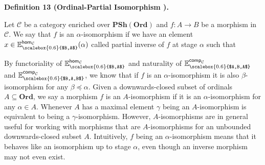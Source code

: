 \documentclass[10pt,a4paper]{article}
\begin{document}
 
 
\par\medskip\noindent\textbf{Definition 13 (Ordinal-Partial Isomorphism ).}\par
 
 
Let $\mathcal{C}$ be a category enriched over $\mathbf{PSh}(\mathbf{Ord})$ and $f:A\to B$ be a morphism in $\mathcal{C}$. We say that $f$ is an $\alpha$-isomorphism if we have an element $x\in\mathbb{E}^{\mathsf{hom}_{\mathcal{C}}}_{\scalebox{0.6}{$B,A$}}(\alpha)$ called partial inverse of $f$ at stage $\alpha$ such that\par
 
\begin{center}\end{center}
 
 
 
 
By functoriality of $\mathbb{E}^{\mathsf{hom}_{\mathcal{C}}}_{\scalebox{0.6}{$B,A$}}$ and naturality of $\mathbb{E}^{\mathsf{comp}_{\mathcal{C}}}_{\scalebox{0.6}{$A,B,A$}}$ and $\mathbb{E}^{\mathsf{comp}_{\mathcal{C}}}_{\scalebox{0.6}{$B,A,B$}}$, we know that if $f$ is an $\alpha$-isomorphism it is also $\beta$-isomorphism for any $\beta\preceq\alpha$. Given a downwards-closed subset of ordinals $A\subseteq\mathbf{Ord}$, we say a morphism $f$ is an $A$-isomorphism if it is an $\alpha$-isomorphism for any $\alpha\in A$. Whenever $A$ has a maximal element $\gamma$ being an $A$-isomorphism is equivalent to being a $\gamma$-isomorphism. However, $A$-isomorphisms are in general useful for working with morphisms that are $A$-isomorphisms for an unbounded downwards-closed subset $A$. Intuitively, $f$ being an $\alpha$-isomorphism means that it behaves like an isomorphism up to stage $\alpha$, even though an inverse morphism may not even exist.\par
 
\end{document}
